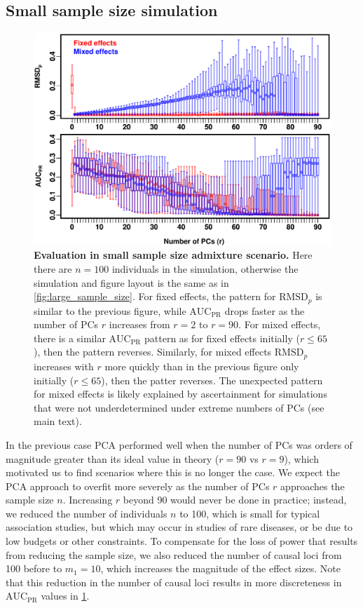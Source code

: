 \documentclass[11pt]{article}
\newcommand{\rmsd}{\text{RMSD}_p}
\newcommand{\auc}{\text{AUC}_\text{PR}}
\begin{document}
\subsection{Small sample size simulation}

\begin{figure}[bp!]
  \centering
  \includegraphics[width=6in]{boxplot_n_100.pdf}
  \caption{
    {\bf Evaluation in small sample size admixture scenario.}
    Here there are $n = 100$ individuals in the simulation, otherwise the simulation and figure layout is the same as in \cref{fig:large_sample_size}.
    For fixed effects, the pattern for $\rmsd$ is similar to the previous figure, while $\auc$ drops faster as the number of PCs $r$ increases from $r=2$ to $r=90$.
    For mixed effects, there is a similar $\auc$ pattern as for fixed effects initially ($r \le 65$), then the pattern reverses.
    Similarly, for mixed effects $\rmsd$ increases with $r$ more quickly than in the previous figure only initially ($r \le 65$), then the patter reverses.
    The unexpected pattern for mixed effects is likely explained by ascertainment for simulations that were not underdetermined under extreme numbers of PCs (see main text).
  }
  \label{fig:small_sample_size}
\end{figure}

In the previous case PCA performed well when the number of PCs was orders of magnitude greater than its ideal value in theory ($r = 90$ vs $r = 9$), which motivated us to find scenarios where this is no longer the case.
We expect the PCA approach to overfit more severely as the number of PCs $r$ approaches the sample size $n$.
Increasing $r$ beyond 90 would never be done in practice; 
instead, we reduced the number of individuals $n$ to 100, which is small for typical association studies, but which may occur in studies of rare diseases, or be due to low budgets or other constraints.
To compensate for the loss of power that results from reducing the sample size, we also reduced the number of causal loci from 100 before to $m_1 = 10$, which increases the magnitude of the effect sizes.
Note that this reduction in the number of causal loci results in more discreteness in $\auc$ values in \cref{fig:small_sample_size}.
\end{document}
